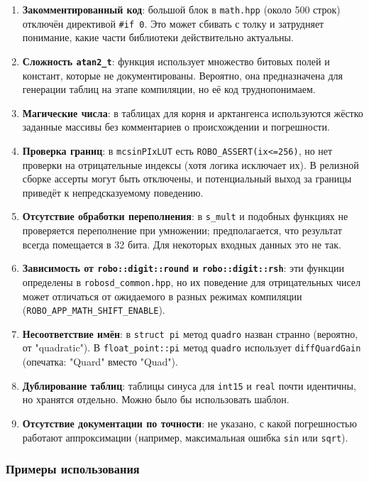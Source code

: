 \documentclass[a4paper,12pt]{article}
\begin{document}
\begin{enumerate}
    \item \textbf{Закомментированный код}: большой блок в \texttt{math.hpp} (около 500 строк) отключён директивой \texttt{\#if 0}. Это может сбивать с толку и затрудняет понимание, какие части библиотеки действительно актуальны.
    \item \textbf{Сложность \texttt{atan2\_t}}: функция использует множество битовых полей и констант, которые не документированы. Вероятно, она предназначена для генерации таблиц на этапе компиляции, но её код труднопонимаем.
    \item \textbf{Магические числа}: в таблицах для корня и арктангенса используются жёстко заданные массивы без комментариев о происхождении и погрешности.
    \item \textbf{Проверка границ}: в \texttt{mcsinPIxLUT} есть \texttt{ROBO\_ASSERT(ix<=256)}, но нет проверки на отрицательные индексы (хотя логика исключает их). В релизной сборке ассерты могут быть отключены, и потенциальный выход за границы приведёт к непредсказуемому поведению.
    \item \textbf{Отсутствие обработки переполнения}: в \texttt{s\_mult} и подобных функциях не проверяется переполнение при умножении; предполагается, что результат всегда помещается в 32 бита. Для некоторых входных данных это не так.
    \item \textbf{Зависимость от \texttt{robo::digit::round} и \texttt{robo::digit::rsh}}: эти функции определены в \texttt{robosd\_common.hpp}, но их поведение для отрицательных чисел может отличаться от ожидаемого в разных режимах компиляции (\texttt{ROBO\_APP\_MATH\_SHIFT\_ENABLE}).
    \item \textbf{Несоответствие имён}: в \texttt{struct pi} метод \texttt{quadro} назван странно (вероятно, от "quadratic"). В \texttt{float\_point::pi} метод \texttt{quadro} использует \texttt{diffQuardGain} (опечатка: "Quard" вместо "Quad").
    \item \textbf{Дублирование таблиц}: таблицы синуса для \texttt{int15} и \texttt{real} почти идентичны, но хранятся отдельно. Можно было бы использовать шаблон.
    \item \textbf{Отсутствие документации по точности}: не указано, с какой погрешностью работают аппроксимации (например, максимальная ошибка \texttt{sin} или \texttt{sqrt}).
\end{enumerate}

\subsubsection{Примеры использования}
\end{document}
